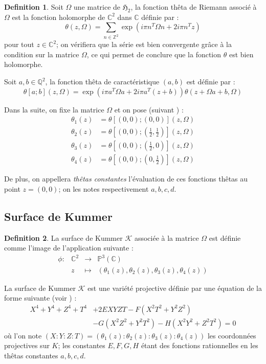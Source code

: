 \documentclass[a4paper]{article}
\theoremstyle{definition}
\newtheorem{definition}{Definition}[section]
\theoremstyle{remark}
\numberwithin{equation}{section}
\begin{document}
\begin{definition}
Soit $\Omega$ une matrice de $\mathfrak{H}_2$, la fonction thêta de Riemann associé à $\Omega$ est la fonction holomorphe de $\mathbb{C}^2$ dans $\mathbb{C}$ définie par :
$$\theta(z,\Omega) = \sum_{n \in \mathbb{Z}^2}{\exp(i\pi n^T \Omega n + 2i\pi n^T z)}$$
pour tout $z \in \mathbb{C}^2$; on vérifiera que la série est bien convergente grâce à la condition sur la matrice $\Omega$, ce qui permet de conclure que la fonction $\theta$ est bien holomorphe.

Soit $a,b \in \mathbb{Q}^2$, la fonction thêta de caractéristique $(a,b)$ est définie par :
$$\theta[a;b](z,\Omega) = \exp(i\pi a^T\Omega a + 2i\pi a^T(z+b))\theta(z + \Omega a + b, \Omega)$$
\end{definition}

Dans la suite, on fixe la matrice $\Omega$ et on pose (suivant \citet{gaudry}) :
\begin{align*}
\theta_1(z) &= \theta[(0,0);(0,0)](z,\Omega) \\
\theta_2(z) &= \theta[(0,0);(\frac{1}{2},\frac{1}{2})](z,\Omega) \\
\theta_3(z) &= \theta[(0,0);(\frac{1}{2},0)](z,\Omega) \\
\theta_4(z) &= \theta[(0,0);(0,\frac{1}{2})](z,\Omega)
\end{align*}

De plus, on appellera \emph{thêtas constantes} l'évaluation de ces fonctions thêtas au point $z=(0,0)$; on les notes respectivement $a,b,c,d$.

\subsection{Surface de Kummer}

\begin{definition}
La surface de Kummer $\mathcal{K}$ associée à la matrice $\Omega$ est définie comme l'image de l'application suivante :
\begin{equation*}
\begin{array}{lrcl}
\phi :&\mathbb{C}^2 & \longrightarrow & \mathbb{P}^3(\mathbb{C}) \\
& z & \longmapsto & (\theta_1(z),\theta_2(z),\theta_3(z),\theta_4(z))
\end{array}
\end{equation*}
\end{definition}

La surface de Kummer $\mathcal{K}$ est une variété projective définie par une équation de la forme suivante (voir \citet{gaudry}) :
\begin{align*}
X^4+Y^4+Z^4+T^4&+2EXYZT-F(X^2T^2+Y^2Z^2) \\
&-G(X^2Z^2+Y^2T^2)-H(X^2Y^2+Z^2T^2)=0
\end{align*}
où l'on note $(X:Y:Z:T)=(\theta_1(z):\theta_2(z):\theta_3(z):\theta_4(z))$ les coordonnées projectives sur $K$; les constantes $E,F,G,H$ étant des fonctions rationnelles en les thêtas constantes $a,b,c,d$.
\end{document}
